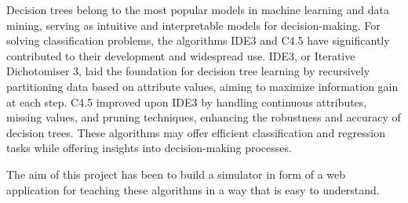 
Decision trees belong to the most popular models in machine learning and data mining, serving as intuitive and interpretable models for decision-making. For solving classification problems, the algorithms IDE3 and C4.5 have significantly contributed to their development and widespread use. IDE3, or Iterative Dichotomiser 3, laid the foundation for decision tree learning by recursively partitioning data based on attribute values, aiming to maximize information gain at each step. C4.5 improved upon IDE3 by handling continuous attributes, missing values, and pruning techniques, enhancing the robustness and accuracy of decision trees. These algorithms may offer efficient classification and regression tasks while offering insights into decision-making processes.

The aim of this project has been to build a simulator in form of a web application for teaching these algorithms in a way that is easy to understand.

